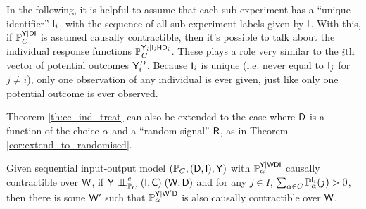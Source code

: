 In the following, it is helpful to assume that each sub-experiment has a ``unique identifier'' $\mathsf{I}_i$, with the sequence of all sub-experiment labels given by $\mathsf{I}$. With this, if $\mathbb{P}_C^{\mathsf{Y}|\mathsf{DI}}$ is assumed causally contractible, then it's possible to talk about the individual response functions $\mathbb{P}_C^{\mathsf{Y}_i|\mathsf{I}_i\mathsf{H}\mathsf{D}_i}$. These plays a role very similar to the $i$th vector of potential outcomes $\mathsf{Y}^D_i$. Because $\mathsf{I}_i$ is unique (i.e. never equal to $\mathsf{I}_j$ for $j\neq i$), only one observation of any individual is ever given, just like only one potential outcome is ever observed.

Theorem \ref{th:cc_ind_treat} can also be extended to the case where $\mathsf{D}$ is a function of the choice $\alpha$ and a ``random signal'' $\mathsf{R}$, as in Theorem \ref{cor:extend_to_randomised}.

\begin{lemma}\label{lem:ind_to_cc}
Given sequential input-output model $(\mathbb{P}_C,(\mathsf{D},\mathsf{I}),\mathsf{Y})$ with $\mathbb{P}_\alpha^{\mathsf{Y}|\mathsf{WDI}}$ causally contractible over $\mathsf{W}$, if $\RV{Y}\CI_{\prob{P}_C}^e (\RV{I},\RV{C})|(\RV{W},\RV{D})$ and for any $j\in I$, $\sum_{\alpha\in C} \mathbb{P}_\alpha^{\mathsf{I}_i}(j)>0$, then there is some $\mathsf{W}'$ such that $\mathbb{P}_\alpha^{\mathsf{Y}|\mathsf{W}'\mathsf{D}}$ is also causally contractible over $\mathsf{W}$.
\end{lemma}


